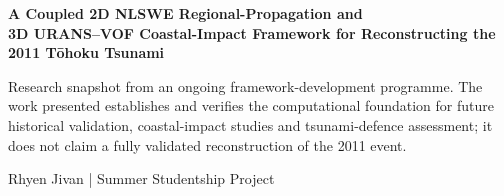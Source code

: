 \documentclass{article}
\newcommand{\PosterTitle}[1]{{\fontsize{43}{47}\selectfont\bfseries #1\par}}
\newcommand{\PosterSubtitle}[1]{{\fontsize{17.5}{21.5}\selectfont #1\par}}
\newcommand{\PosterMeta}[1]{{\fontsize{15.4}{18.5}\selectfont #1\par}}
\begin{document}
\begin{tcolorbox}[
  enhanced,
  colback=PosterPrimary,
  colframe=PosterPrimary,
  arc=3mm,
  boxrule=0pt,
  left=12mm,
  right=12mm,
  top=8mm,
  bottom=7mm
]
  {\color{white}
  \PosterTitle{A Coupled 2D NLSWE Regional-Propagation and\\
  3D URANS--VOF Coastal-Impact Framework for Reconstructing the\\
  2011 Tōhoku Tsunami}
  \vspace{1.8mm}
  \PosterSubtitle{Research snapshot from an ongoing framework-development programme. The work presented establishes and verifies the computational foundation for future historical validation, coastal-impact studies and tsunami-defence assessment; it does not claim a fully validated reconstruction of the 2011 event.}
  \vspace{1.8mm}
  \PosterMeta{Rhyen Jivan \quad | \quad Summer Studentship Project}
  }
\end{tcolorbox}

\vspace{3.6mm}
\end{document}

